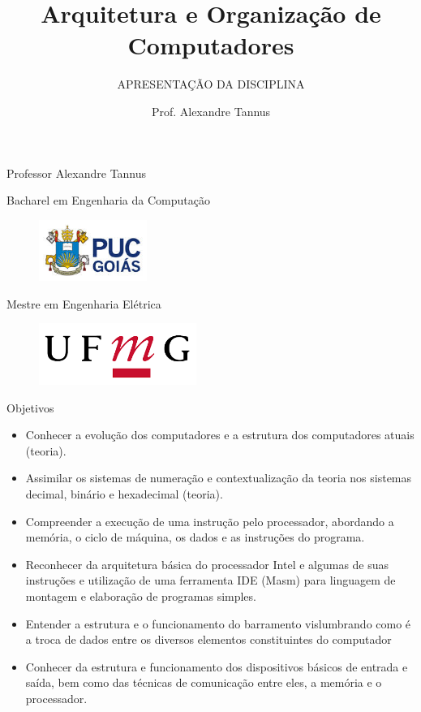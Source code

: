 \documentclass[aspectratio=169,
				xcolor=table]{beamer}
\institute[]{\uppercase{Engenharia de Software}}
\title[]{Arquitetura e Organização de Computadores}
\subtitle[]{\uppercase{Apresentação da Disciplina}}
\author[]{Prof. Alexandre Tannus}
\date{}
\begin{document}
	\begin{frame}
		\titlepage
	\end{frame}
	
	\begin{frame}{Professor Alexandre Tannus}
		\begin{center}
			\centering
			\huge Bacharel em Engenharia da Computação
			\begin{figure}
			\centering
				\includegraphics[height=2cm, keepaspectratio]{../figs/puc.jpg} 			
			\end{figure}
			\huge Mestre em Engenharia Elétrica
			\begin{figure}
			\centering
				\includegraphics[height=2cm, keepaspectratio]{../figs/ufmg.png} 		
			\end{figure}
		\end{center}
	\end{frame}
	
	\begin{frame}[allowframebreaks]{Objetivos}
		\begin{itemize}
			\item Conhecer a evolução dos computadores e a estrutura dos computadores atuais (teoria).
			\vspace{1em}
			\item Assimilar os sistemas de numeração e contextualização da teoria nos sistemas decimal, binário e hexadecimal (teoria). 
			\vspace{1em}
			\item Compreender a execução de uma instrução pelo processador, abordando a memória, o ciclo de máquina, os dados e as instruções do programa.
			\vspace{1em}
			\item Reconhecer da arquitetura básica do processador Intel e algumas de suas instruções e utilização de uma ferramenta IDE (Masm) para linguagem de montagem e elaboração de programas simples. 
			\vspace{1em}
			\item Entender a estrutura e o funcionamento do barramento vislumbrando como é a troca de dados entre os diversos elementos constituintes do computador
			\vspace{1em}
			\item Conhecer da estrutura e funcionamento dos dispositivos básicos de entrada e saída, bem como das técnicas de comunicação entre eles, a memória e o processador. 

		\end{itemize}
	\end{frame}
\end{document}
